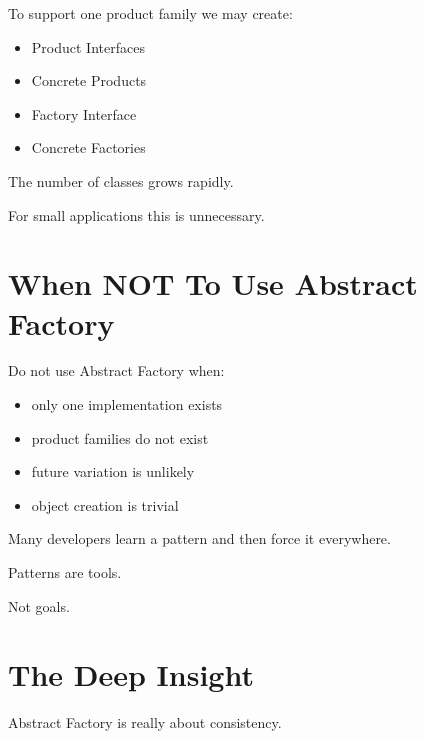 \documentclass[11pt,a4paper]{book}
\begin{document}
To support one product family we may create:

\begin{itemize}
\item Product Interfaces
\item Concrete Products
\item Factory Interface
\item Concrete Factories
\end{itemize}

The number of classes grows rapidly.

For small applications this is unnecessary.


\section{When NOT To Use Abstract Factory}

Do not use Abstract Factory when:

\begin{itemize}
\item only one implementation exists
\item product families do not exist
\item future variation is unlikely
\item object creation is trivial
\end{itemize}

\begin{trap}

Many developers learn a pattern and then force it
everywhere.

Patterns are tools.

Not goals.

\end{trap}


\section{The Deep Insight}

\begin{idea}

Abstract Factory is really about consistency.

\end{idea}
\end{document}
